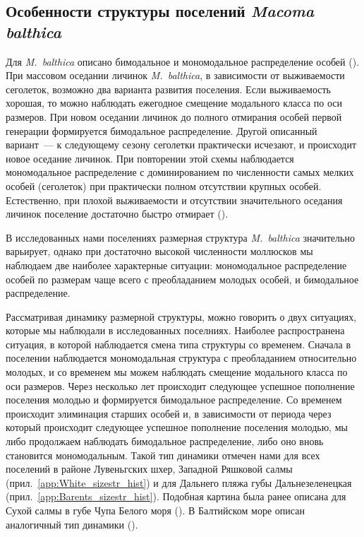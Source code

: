 	\subsection{Особенности структуры поселений {\it Macoma balthica}}
Для \textit{M.~balthica} описано бимодальное и мономодальное распределение особей (\cite{Segerstrale_1969, Maximovich_et_al_1991, Nikolaeva_1997, Nikolaeva_1998}). 
При массовом оседании личинок  \textit{M.~balthica}, в зависимости от выживаемости сеголеток, возможно два варианта развития поселения. 
Если выживаемость хорошая, то можно наблюдать ежегодное смещение модального класса по оси размеров. 
При новом оседании личинок до полного отмирания особей первой генерации формируется бимодальное распределение. 
Другой описанный вариант~--- к следующему сезону сеголетки практически исчезают, и происходит новое оседание личинок. 
При повторении этой схемы наблюдается мономодальное распределение с доминированием по численности самых мелких особей (сеголеток) при практически полном отсутствии крупных особей. Естественно, при плохой выживаемости и отсутствии значительного оседания личинок поселение достаточно быстро отмирает (\cite{Maximovich_et_al_1991}).

В исследованных нами поселениях размерная структура \textit{M.~balthica} значительно варьирует, однако при достаточно высокой численности моллюсков мы наблюдаем две наиболее характерные ситуации: мономодальное распределение особей по размерам чаще всего с преобладанием молодых особей, и бимодальное распределение.

Рассматривая динамику размерной структуры, можно говорить о  двух ситуациях, которые мы наблюдали в исследованных поселниях.
Наиболее распространена ситуация, в которой наблюдается смена типа структуры со временем. 
Сначала в поселении наблюдается мономодальная структура с преобладанием относительно молодых, и со временем мы можем наблюдать смещение модального класса по оси размеров. 
Через несколько лет происходит следующее успешное пополнение поселения молодью и формируется бимодальное распределение.
Со временем происходит элиминация старших особей и, в зависимости от периода через который происходит следующее успешное пополнение поселения молодью, мы либо продолжаем наблюдать бимодальное распределение, либо оно вновь становится мономодальным.
Такой тип динамики отмечен нами для всех поселений в районе Лувеньгских шхер, Западной Ряшковой салмы (прил.~\ref{app:White_sizestr_hist}) и для Дальнего пляжа губы Дальнезеленецкая (прил.~\ref{app:Barents_sizestr_hist}).
Подобная картина была ранее описана для Сухой салмы в губе Чупа Белого моря (\cite{Maximovich_et_al_1991}).
В Балтийском море описан аналогичный тип динамики (\cite{Segerstrale_1969}).

